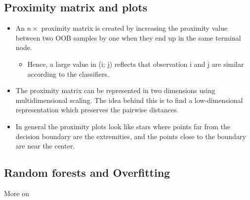\subsection{Proximity matrix and plots}

\begin{itemize}
  \item An $n \times $ proximity matrix is created by increasing the proximity value between two OOB samples by one when they end up in the same terminal node.
      \begin{itemize}
        \item Hence, a large value in (i; j) reflects that observation i and j are similar according to the classifiers.
      \end{itemize}
  \item The proximity matrix can be represented in two dimensions using multidimensional scaling. The idea behind this is to find a low-dimensional representation which preserves the pairwise distances.
  \item In general the proximity plots look like stars where points far from the decision boundary are the extremities, and the points close to the boundary are near the center.
\end{itemize}

\subsection{Random forests and Overfitting}

More on \cite[p.~596]{friedman2016elements}
 